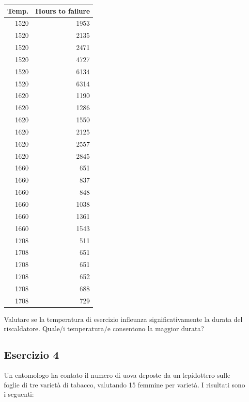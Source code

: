 \documentclass[a4paper,12pt,oneside]{book}
\begin{document}
\begin{longtable}[]{@{}rr@{}}
\toprule
Temp. & Hours to failure \\
\midrule
\endhead
1520 & 1953 \\
1520 & 2135 \\
1520 & 2471 \\
1520 & 4727 \\
1520 & 6134 \\
1520 & 6314 \\
1620 & 1190 \\
1620 & 1286 \\
1620 & 1550 \\
1620 & 2125 \\
1620 & 2557 \\
1620 & 2845 \\
1660 & 651 \\
1660 & 837 \\
1660 & 848 \\
1660 & 1038 \\
1660 & 1361 \\
1660 & 1543 \\
1708 & 511 \\
1708 & 651 \\
1708 & 651 \\
1708 & 652 \\
1708 & 688 \\
1708 & 729 \\
\bottomrule
\end{longtable}

Valutare se la temperatura di esercizio infleunza significativamente la durata del riscaldatore. Quale/i temperatura/e consentono la maggior durata?

\hypertarget{esercizio-4-5}{%
\subsection{Esercizio 4}\label{esercizio-4-5}}

Un entomologo ha contato il numero di uova deposte da un lepidottero sulle foglie di tre varietà di tabacco, valutando 15 femmine per varietà. I risultati sono i seguenti:
\end{document}
